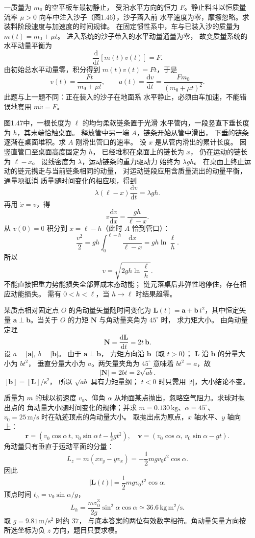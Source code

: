 一质量为 $m_0$ 的空平板车最初静止，
受沿水平方向的恒力 $F$。静止料斗以恒质量流率
$\mu>0$ 向车中注入沙子（图1.46），沙子落入前
水平速度为零，摩擦忽略。求装料阶段速度与加速度的时间规律。
\exsolution
在固定惯性系中，车与已装入沙的质量为
$m(t)=m_0+\mu t$。
进入系统的沙子带入的水平动量通量为零，
故变质量系统的水平动量平衡为
\[
\frac{\mathrm d}{\mathrm dt}[m(t)v(t)]=F.
\]
由初始总水平动量零，积分得到
$m(t)v(t)=Ft$，于是
\[
\boxed{v(t)=\frac{Ft}{m_0+\mu t}},\qquad
\boxed{a(t)=\frac{\mathrm dv}{\mathrm dt}
=\frac{Fm_0}{(m_0+\mu t)^2}}.
\]
\excheck 此题与上一题不同：正在装入的沙子在地面系
水平静止，必须由车加速，不能错误地套用 $m\dot v=F$。

图1.47中，一根长度为 $\ell$ 的均匀柔软链条置于光滑
水平管内，一段竖直下垂长度为 $h$，其末端恰触桌面。
释放管中另一端 $A$，链条开始从管中滑出，
下垂的链条逐渐在桌面堆积。求 $A$ 刚滑出管口的速率。
\exsolution
设 $x$ 是从管内滑出的累计长度。
因竖直管口至桌面高度固定为 $h$，
已经堆积在桌面上的链长为 $x$，
仍在运动的链长为 $\ell-x$。
设线密度为 $\lambda$，运动链条的重力驱动力
始终为 $\lambda gh$。
在桌面上终止运动的链元携走与当前链条相同的动量，
对运动链段应用含质量流出的动量平衡，通量项抵消
质量随时间变化的相应项，得到
\[
\lambda(\ell-x)\frac{\mathrm dv}{\mathrm dt}
=\lambda gh .
\]
再用 $\dot x=v$，得
\[
v\frac{\mathrm dv}{\mathrm dx}=\frac{gh}{\ell-x}.
\]
从 $v(0)=0$ 积分到 $x=\ell-h$（此时 $A$ 恰到管口）：
\[
\frac{v^2}{2}
=gh\int_0^{\ell-h}\frac{\mathrm dx}{\ell-x}
=gh\ln\frac{\ell}{h}.
\]
所以
\[
\boxed{v=\sqrt{2gh\ln\frac{\ell}{h}}}.
\]
\excheck 不能直接把重力势能损失全部算成末态动能；
链元落桌后非弹性地停住，存在相应动能损失。
需有 $0<h<\ell$，当 $h\to\ell$ 时结果趋零。

某质点相对固定点 $O$ 的角动量矢量随时间变化为
$\bm L(t)=\bm a+\bm b\,t^2$，其中恒定矢量
$\bm a\perp\bm b$。当关于 $O$ 的力矩
$\bm N$ 与角动量夹角为 $45^\circ$ 时，
求力矩大小。
\exsolution
由角动量定理
\[
\bm N=\frac{\mathrm d\bm L}{\mathrm dt}=2t\,\bm b.
\]
设 $a=|\bm a|,\ b=|\bm b|$。
由于 $\bm a\perp\bm b$，
力矩方向沿 $\bm b$（取 $t>0$）；
$\bm L$ 沿 $\bm b$ 的分量大小为 $bt^2$，
垂直分量大小为 $a$。两矢量夹角为 $45^\circ$ 意味着
$bt^2=a$，故
\[
\boxed{|\bm N|=2bt=2\sqrt{ab}}.
\]
\excheck $[\bm b]=[\bm L]/\mathrm s^2$，
所以 $\sqrt{ab}$ 具有力矩量纲；
$t<0$ 时只需用 $|t|$，大小结论不变。

质量为 $m$ 的球以初速度 $v_0$、仰角 $\alpha$
从地面某点抛出，忽略空气阻力。求球对抛出点的
角动量大小随时间变化的规律；并求
$m=0.130\,\mathrm{kg}$、$\alpha=45^\circ$、
$v_0=25\,\mathrm{m/s}$ 时在轨迹顶点的角动量大小。
\exsolution
取抛出点为原点，$x$ 轴水平、$y$ 轴向上：
\[
\bm r=(v_0\cos\alpha\,t,\,
v_0\sin\alpha\,t-\tfrac12gt^2),\quad
\bm v=(v_0\cos\alpha,\,v_0\sin\alpha-gt).
\]
角动量只有垂直于运动平面的分量：
\[
L_z=m(xv_y-yv_x)=-\frac12mgv_0t^2\cos\alpha.
\]
因此
\[
\boxed{|\bm L(t)|=\frac12mgv_0t^2\cos\alpha}.
\]
顶点时间 $t_h=v_0\sin\alpha/g$，
\[
\boxed{L_h=\frac{mv_0^3}{2g}\sin^2\alpha\cos\alpha
\simeq36.6\,\mathrm{kg\,m^2/s}}.
\]
\excheck 取 $g=9.81\,\mathrm{m/s^2}$ 时约 $37$，
与底本答案的两位有效数字相符。角动量矢量方向按
所选坐标为负 $z$ 方向，题目只要求模。

